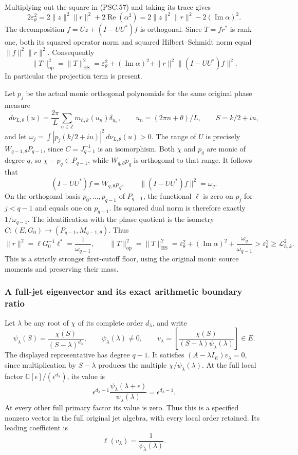 Multiplying out the square in (PSC.57) and taking its trace gives
\[
 2\varepsilon_\theta^2
 =2\|z\|^2\|r\|^2+2\operatorname{Re}(\alpha^2)
 =2\|z\|^2\|r\|^2-2(\operatorname{Im}\alpha)^2.
 \]
The decomposition \(f=Uz+(I-UU^*)f\) is orthogonal. Since \(T=fr^*\) is rank one, both its squared operator norm and squared Hilbert–Schmidt norm equal \(\|f\|^2\|r\|^2\). Consequently
\[
 \boxed{
 \|T\|_{\mathrm{op}}^2=\|T\|_{\mathrm{HS}}^2
 =\varepsilon_\theta^2+(\operatorname{Im}\alpha)^2
     +\|r\|^2\|(I-UU^*)f\|^2.}
 \tag{PSC.58}
\]
In particular the projection term is present.

Let \(p_j\) be the actual monic orthogonal polynomials for the same original phase measure
\[
 d\nu_{L,\theta}(u)
 =\frac{2\pi}{L}\sum_{n\in\mathbb Z}
       m_{h,k}(u_n)\delta_{u_n},\qquad
 u_n=(2\pi n+\theta)/L,\qquad S=k/2+iu,
 \]
and let \(\omega_j=\int|p_j(k/2+iu)|^2\,d\nu_{L,\theta}(u)>0\).
The range of \(U\) is precisely \(W_{q-1,\theta}P_{q-1}\), since \(C=J_{q-1}^{-1}\) is an isomorphism. Both \(\chi\) and \(p_q\) are monic of degree \(q\), so \(\chi-p_q\in P_{q-1}\), while \(W_{q,\theta}p_q\) is orthogonal to that range. It follows that
\[
 (I-UU^*)f=W_{q,\theta}p_q,\qquad
 \|(I-UU^*)f\|^2=\omega_q.
 \tag{PSC.59}
\]
On the orthogonal basis \(p_0,\ldots,p_{q-1}\) of \(P_{q-1}\), the functional \(\ell\) is zero on \(p_j\) for \(j<q-1\) and equals one on \(p_{q-1}\). Its squared dual norm is therefore exactly \(1/\omega_{q-1}\). The identification with the phase quotient is the isometry \(C:(E,G_0)\to(P_{q-1},M_{q-1,\theta})\). Thus
\[
 \|r\|^2=\ell G_0^{-1}\ell^*=\frac1{\omega_{q-1}},\qquad
 \boxed{\|T\|_{\mathrm{op}}^2=\|T\|_{\mathrm{HS}}^2
 =\varepsilon_\theta^2+(\operatorname{Im}\alpha)^2
     +\frac{\omega_q}{\omega_{q-1}}
 >\varepsilon_\theta^2\geq\mathcal L_{h,k}^2.}
 \tag{PSC.60}
\]
This is a strictly stronger first-cutoff floor, using the original monic source moments and preserving their mass.

\subsubsection{A full-jet eigenvector and its exact arithmetic boundary ratio}

Let \(\lambda\) be any root of \(\chi\) of its complete order \(d_\lambda\), and write
\[
 \psi_\lambda(S)=\frac{\chi(S)}{(S-\lambda)^{d_\lambda}},
 \qquad \psi_\lambda(\lambda)\ne0,\qquad
 v_\lambda=
 \left[\frac{\chi(S)}
 {(S-\lambda)\psi_\lambda(\lambda)}\right]\in E.
 \tag{PSC.61}
\]
The displayed representative has degree \(q-1\).
It satisfies \((A-\lambda I_E)v_\lambda=0\), since multiplication by \(S-\lambda\) produces the multiple \(\chi/\psi_\lambda(\lambda)\).
At the full local factor
\(\mathbb C[\epsilon]/(\epsilon^{d_\lambda})\), its value is
\[
 \epsilon^{d_\lambda-1}
 \frac{\psi_\lambda(\lambda+\epsilon)}{\psi_\lambda(\lambda)}
 =\epsilon^{d_\lambda-1}.
 \]
At every other full primary factor its value is zero. Thus this is a specified nonzero vector in the full original jet algebra, with every local order retained. Its leading coefficient is
\[
 \ell(v_\lambda)=\frac1{\psi_\lambda(\lambda)}.
 \tag{PSC.62}
\]

